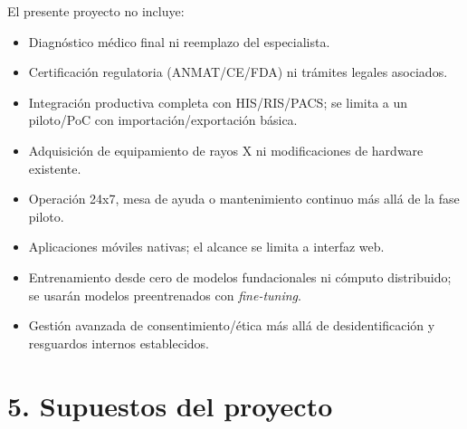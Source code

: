 \documentclass[
11pt, %
]{charter}
\begin{document}
El presente proyecto no incluye:
\begin{itemize}
  \item Diagnóstico médico final ni reemplazo del especialista.
  \item Certificación regulatoria (ANMAT/CE/FDA) ni trámites legales asociados.
  \item Integración productiva completa con HIS/RIS/PACS; se limita a un piloto/PoC con importación/exportación básica.
  \item Adquisición de equipamiento de rayos X ni modificaciones de hardware existente.
  \item Operación 24x7, mesa de ayuda o mantenimiento continuo más allá de la fase piloto.
  \item Aplicaciones móviles nativas; el alcance se limita a interfaz web.
  \item Entrenamiento desde cero de modelos fundacionales ni cómputo distribuido; se usarán modelos preentrenados con \textit{fine-tuning}.
  \item Gestión avanzada de consentimiento/ética más allá de desidentificación y resguardos internos establecidos.
\end{itemize}



\section{5. Supuestos del proyecto}
\label{sec:supuestos}
 
\end{document}
